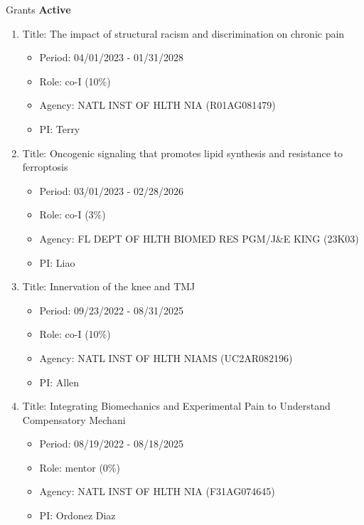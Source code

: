 \documentclass{resume} %
\begin{document}
\begin{rSection}{Grants}
\textbf{Active}

\begin{enumerate}[noitemsep,topsep=0pt]
\item Title: The impact of structural racism and discrimination on chronic pain
\begin{itemize}[noitemsep,topsep=0pt,leftmargin=*]
\item[] Period: 04/01/2023 - 01/31/2028
\item[] Role: co-I (10\%)
\item[] Agency: NATL INST OF HLTH NIA (R01AG081479)
\item[] PI: Terry
\end{itemize}

\item Title: Oncogenic signaling that promotes lipid synthesis and resistance to ferroptosis
\begin{itemize}[noitemsep,topsep=0pt,leftmargin=*]
\item[] Period: 03/01/2023 - 02/28/2026
\item[] Role: co-I (3\%)
\item[] Agency: FL DEPT OF HLTH BIOMED RES PGM/J\&E KING (23K03)
\item[] PI: Liao
\end{itemize}

\item Title: Innervation of the knee and TMJ
\begin{itemize}[noitemsep,topsep=0pt,leftmargin=*]
\item[] Period: 09/23/2022 - 08/31/2025
\item[] Role: co-I (10\%)
\item[] Agency: NATL INST OF HLTH NIAMS (UC2AR082196)
\item[] PI: Allen
\end{itemize}

\item Title: Integrating Biomechanics and Experimental Pain to Understand Compensatory Mechani
\begin{itemize}[noitemsep,topsep=0pt,leftmargin=*]
\item[] Period: 08/19/2022 - 08/18/2025
\item[] Role: mentor (0\%)
\item[] Agency: NATL INST OF HLTH NIA (F31AG074645)
\item[] PI: Ordonez Diaz
\end{itemize}


\end{enumerate}
\end{rSection}
\end{document}
